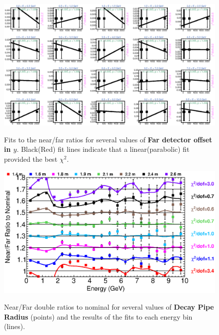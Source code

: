 \begin{figure}[ht]
  \begin{center}
    {\includegraphics[width=5.0in]{figures/LBNEFDY_nof_fits.eps}}
  \end{center}
\caption{ Fits to the near/far ratios for several values of {\bf Far detector offset in $y$}. Black(Red) fit lines indicate that a linear(parabolic) fit provided the best $\chi^2$. }
\end{figure}

\begin{figure}[ht]
  \begin{center}
    {\includegraphics[width=6.0in]{figures/DecayPipeRadius_nof_summary.eps}}
  \end{center}
\caption{ Near/Far double ratios to nominal for several values of {\bf Decay Pipe Radius} (points) and the results of the fits to each energy bin (lines).}
\end{figure}

